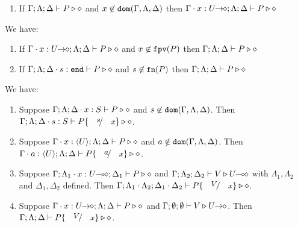 \begin{lemma}\rm
	\label{l:weak}
	\begin{enumerate}[$-$]
		\item	If $\Gamma; \Lambda; \Delta \vdash P \triangleright \diamond$
			and
			$x \not\in \mathtt{dom}(\Gamma,\Lambda,\Delta)$
			then
			$\Gamma\cdot x: U\!\! \rightarrow\!\! \diamond; \Lambda; \Delta \vdash P \triangleright \diamond$ 
	\end{enumerate}
\end{lemma}

\begin{lemma}\rm
	\label{l:stren}
	We have:
	\begin{enumerate}[$-$]
		\item	If $\Gamma \cdot x: U\!\! \rightarrow\!\! \diamond; \Lambda; \Delta \vdash P \triangleright \diamond$
			and
			$x \not\in \mathtt{fpv}(P)$ then
			$\Gamma; \Lambda; \Delta \vdash P \triangleright \diamond$

		\item	If $\Gamma; \Lambda; \Delta \cdot s: \mathtt{end} \vdash P \triangleright \diamond$
			and
			$s \not\in \mathtt{fn}(P)$
			then
			$\Gamma; \Lambda; \Delta \vdash P \triangleright \diamond$
	\end{enumerate}
\end{lemma}

\begin{lemma}\rm
	\label{l:subst}
	We have:
	\begin{enumerate}[1.]
		\item	Suppose $\Gamma; \Lambda; \Delta \cdot x:S  \vdash P \triangleright \diamond$ and
			$s \not\in \mathtt{dom}(\Gamma, \Lambda, \Delta)$. 
			Then $\Gamma; \Lambda; \Delta \cat s:S  \vdash P\subst{s}{x} \hastype \Proc$.

		\item	Suppose $\Gamma \cdot x:\langle U \rangle; \Lambda; \Delta \vdash P \triangleright \diamond$ and
			$a \notin \mathtt{dom}(\Gamma, \Lambda, \Delta)$. 
			Then $\Gamma \cat a:\chtype{U}; \Lambda; \Delta   \vdash P\subst{a}{x} \hastype \Proc$.

		\item	Suppose $\Gamma; \Lambda_1 \cdot x:U\!\! \multimap\!\! \diamond; \Delta_1  \vdash P \triangleright \diamond$ 
			and $\Gamma; \Lambda_2; \Delta_2  \vdash V \triangleright U\!\! \multimap\!\! \diamond$ with 
			$\Lambda_1, \Lambda_2$ and $\Delta_1, \Delta_2$ defined.  
			Then $\Gamma; \Lambda_1 \cat \Lambda_2; \Delta_1 \cat \Delta_2  \proves P\subst{V}{x} \hastype \Proc$.

		\item	Suppose $\Gamma \cdot x:U\!\! \rightarrow\!\! \diamond; \Lambda; \Delta  \vdash P \triangleright \diamond$ and
			$\Gamma; \emptyset ; \emptyset  \vdash V \triangleright U\!\! \rightarrow\!\! \diamond$.
			Then $\Gamma; \Lambda; \Delta  \proves P\subst{V}{x} \hastype \Proc$.
		\end{enumerate}
\end{lemma}

